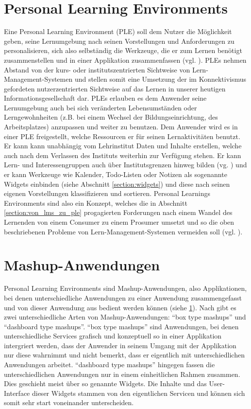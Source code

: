 \section{Personal Learning Environments}\label{section:ple_intro}
Eine Personal Learning Environment (PLE) soll dem Nutzer die Möglichkeit geben, seine Lernumgebung nach seinen Vorstellungen und Anforderungen zu personalisieren, sich also selbständig die Werkzeuge, die er zum Lernen benötigt zusammenstellen und in einer Applikation zusammenfassen (vgl. \cite{VanHarmelen}). PLEs nehmen Abstand von der kurs- oder institutszentrierten Sichtweise von Lern-Management-Systemen und stellen somit eine Umsetzung der im Konnektivismus gefordeten nutzerzentrierten Sichtweise auf das Lernen in unserer heutigen Informationsgesellschaft dar. PLEs erlauben es dem Anwender seine Lernumgebung auch bei sich veränderten Lebensumständen oder Lerngewohnheiten (z.B. bei einem Wechsel der Bildungseinrichtung, des Arbeitsplatzes) anzupassen und weiter zu benutzen. Dem Anwender wird es in einer PLE freigestellt, welche Ressourcen er für seinen Lernaktivitäten benutzt. Er kann kann unabhängig vom Lehrinstitut Daten und Inhalte erstellen, welche auch nach dem Verlassen des Instituts weiterhin zur Verfügung stehen. Er kann Lern- und Interessengruppen auch über Institutsgrenzen hinweg bilden (vg. \cite{Schaffert2008a}) und er kann Werkzeuge wie Kalender, Todo-Listen oder Notizen als sogenannte Widgets einbinden (siehe Abschnitt \ref{section:widgets}) und diese nach seinen eigenen Vorstellungen klassifizieren und sortieren. Personal Learnings Environments sind also ein Konzept, welches die in Abschnitt \ref{section:von_lms_zu_ple} progagierten Forderungen nach einem Wandel des Lernenden von einem Consumer zu einem Prosumer umsetzt und so die oben beschriebenen Probleme von Lern-Management-Systemen vermeiden soll (vgl. \cite{Attwell2007}).

\section{Mashup-Anwendungen}\label{section:mashup_anwendungen}
Personal Learning Environments sind Mashup-Anwendungen, also Applikationen, bei denen unterschiedliche Anwendungen zu einer Anwendung zusammengefasst und von dieser Anwendung aus bedient werden können (siehe \ref{section:ple_intro}). Nach \cite{Soylu2011} gibt es zwei unterschiedliche Arten von Mashup-Anwendungen: "`box type mashups"' und "`dashboard type mashups"'. "`box type mashups"' sind Anwendungen, bei denen unterschiedliche Services grafisch und konzeptuell so in einer Applikation intergriert werden, dass der Anwender in seinem Umgang mit der Applikation nur diese wahrnimmt und nicht bemerkt, dass er eigentlich mit unterschiedlichen Anwendungen arbeitet. "`dashboard type mashups"' hingegen fassen die unterschiedlichen Anwendungen nur in einem einheitlichen Rahmen zusammen. Dies geschieht meist über so genannte Widgets. Die Inhalte und das User-Interface dieser Widgets stammen von den eigentlichen Servicen und können sich somit sehr start voneinander unterscheiden. 

